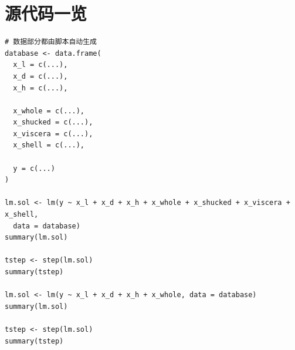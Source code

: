\documentclass[hyperref,UTF8,12pt,a4paper]{ctexart}
\begin{document}
\section{源代码一览}

\begin{verbatim}
# 数据部分都由脚本自动生成
database <- data.frame(
  x_l = c(...),
  x_d = c(...),
  x_h = c(...),

  x_whole = c(...),
  x_shucked = c(...),
  x_viscera = c(...),
  x_shell = c(...),

  y = c(...)
)

lm.sol <- lm(y ~ x_l + x_d + x_h + x_whole + x_shucked + x_viscera + x_shell,
  data = database)
summary(lm.sol)

tstep <- step(lm.sol)
summary(tstep)

lm.sol <- lm(y ~ x_l + x_d + x_h + x_whole, data = database)
summary(lm.sol)

tstep <- step(lm.sol)
summary(tstep)
\end{verbatim}
\end{document}
